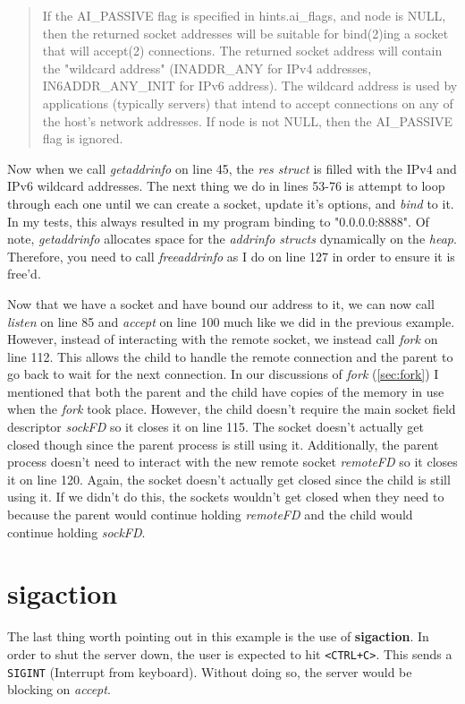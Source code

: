 \documentclass[../main.tex]{subfiles}
\begin{document}
	\begin{quotation}
	If the AI\_PASSIVE flag is specified in hints.ai\_flags, and node is NULL, then the returned socket addresses will be suitable for bind(2)ing a socket that will accept(2) connections.  The returned socket address will contain the "wildcard address" (INADDR\_ANY for IPv4
	addresses, IN6ADDR\_ANY\_INIT for IPv6 address).  The wildcard address is used by applications (typically servers) that intend to accept connections on any of the host's network addresses.  If node is not NULL, then the AI\_PASSIVE flag is ignored.
	\end{quotation}  
	
	Now when we call \textit{getaddrinfo} on line 45, the \textit{res struct} is filled with the IPv4 and IPv6 wildcard addresses.  The next thing we do in lines 53-76 is attempt to loop through each one until we can create a socket, update it's options, and \textit{bind} to it.  In my tests, this always resulted in my program binding to "0.0.0.0:8888".  Of note, \textit{getaddrinfo} allocates space for the \textit{addrinfo structs} dynamically on the \textit{heap}.  Therefore, you need to call \textit{freeaddrinfo} as I do on line 127 in order to ensure it is free'd.
	
	Now that we have a socket and have bound our address to it, we can now call \textit{listen} on line 85 and \textit{accept} on line 100 much like we did in the previous example.  However, instead of interacting with the remote socket, we instead call \textit{fork} on line 112.  This allows the child to handle the remote connection and the parent to go back to wait for the next connection.  In our discussions of \textit{fork} (\ref{sec:fork}) I mentioned that both the parent and the child have copies of the memory in use when the \textit{fork} took place.  However, the child doesn't require the main socket field descriptor \textit{sockFD} so it closes it on line 115.  The socket doesn't actually get closed though since the parent process is still using it.  Additionally, the parent process doesn't need to interact with the new remote socket \textit{remoteFD} so it closes it on line 120.  Again, the socket doesn't actually get closed since the child is still using it.  If we didn't do this, the sockets wouldn't get closed when they need to because the parent would continue holding \textit{remoteFD} and the child would continue holding \textit{sockFD}.
	
	\section{sigaction}
	The last thing worth pointing out in this example is the use of \textbf{sigaction}.  In order to shut the server down, the user is expected to hit \texttt{<CTRL+C>}.  This sends a \texttt{SIGINT} (Interrupt from keyboard).  Without doing so, the server would be blocking on \textit{accept}.  
	
\end{document}
